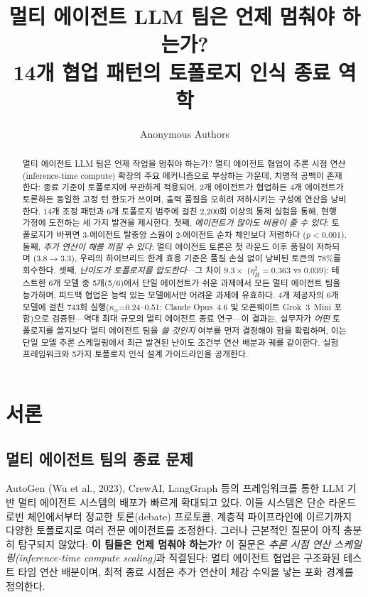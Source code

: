 \documentclass[a4paper,11pt]{article}
\title{멀티 에이전트 LLM 팀은 언제 멈춰야 하는가? \\ 14개 협업 패턴의 토폴로지 인식 종료 역학}
\author{Anonymous Authors}
\date{}
\begin{document}
\maketitle

\begin{abstract}
멀티 에이전트 LLM 팀은 언제 작업을 멈춰야 하는가? 멀티 에이전트 협업이 추론 시점 연산(inference-time compute) 확장의 주요 메커니즘으로 부상하는 가운데, 치명적 공백이 존재한다: 종료 기준이 토폴로지에 무관하게 적용되어, 2개 에이전트가 협업하든 4개 에이전트가 토론하든 동일한 고정 턴 한도가 쓰이며, 출력 품질을 오히려 저하시키는 구성에 연산을 낭비한다. 14개 조정 패턴과 6개 토폴로지 범주에 걸친 2,200회 이상의 통제 실험을 통해, 현행 가정에 도전하는 세 가지 발견을 제시한다. 첫째, \emph{에이전트가 많아도 비용이 줄 수 있다}: 토폴로지가 바뀌면 3-에이전트 탈중앙 스웜이 2-에이전트 순차 체인보다 저렴하다 ($p<0.001$). 둘째, \emph{추가 연산이 해를 끼칠 수 있다}: 멀티 에이전트 토론은 첫 라운드 이후 품질이 저하되며 ($3.8 \to 3.3$), 우리의 하이브리드 한계 효용 기준은 품질 손실 없이 낭비된 토큰의 78\%를 회수한다. 셋째, \emph{난이도가 토폴로지를 압도한다}---그 차이 $9.3\times$ ($\eta^{2}_{H}=0.363$ vs $0.039$): 테스트한 6개 모델 중 5개(5/6)에서 단일 에이전트가 쉬운 과제에서 모든 멀티 에이전트 팀을 능가하며, 피드백 협업은 능력 있는 모델에서만 어려운 과제에 유효하다. 4개 제공자의 6개 모델에 걸친 743회 실행($\kappa_w$=0.24--0.51; Claude Opus~4.6 및 오픈웨이트 Grok~3~Mini 포함)으로 검증된---역대 최대 규모의 멀티 에이전트 종료 연구---이 결과는, 실무자가 \emph{어떤} 토폴로지를 쓸지보다 멀티 에이전트 팀을 \emph{쓸 것인지} 여부를 먼저 결정해야 함을 확립하며, 이는 단일 모델 추론 스케일링에서 최근 발견된 난이도 조건부 연산 배분과 궤를 같이한다. 실험 프레임워크와 5가지 토폴로지 인식 설계 가이드라인을 공개한다.
\end{abstract}

\section{서론}

\subsection{멀티 에이전트 팀의 종료 문제}

AutoGen (Wu et al., 2023), CrewAI, LangGraph 등의 프레임워크를 통한 LLM 기반 멀티 에이전트 시스템의 배포가 빠르게 확대되고 있다. 이들 시스템은 단순 라운드 로빈 체인에서부터 정교한 토론(debate) 프로토콜, 계층적 파이프라인에 이르기까지 다양한 토폴로지로 여러 전문 에이전트를 조정한다. 그러나 근본적인 질문이 아직 충분히 탐구되지 않았다: \textbf{이 팀들은 언제 멈춰야 하는가?} 이 질문은 \emph{추론 시점 연산 스케일링(inference-time compute scaling)}과 직결된다: 멀티 에이전트 협업은 구조화된 테스트 타임 연산 배분이며, 최적 종료 시점은 추가 연산이 체감 수익을 낳는 포화 경계를 정의한다.
\end{document}
